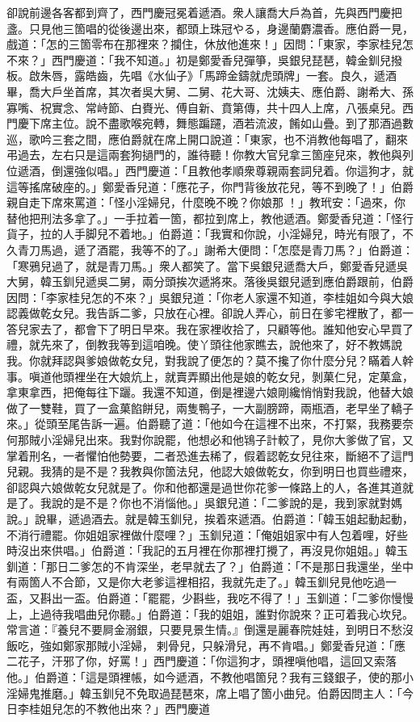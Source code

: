 卻說前邊各客都到齊了，西門慶冠冕着遞酒。衆人讓喬大戶為首，先與西門慶把盞。只見他三箇唱的從後邊出來，都頭上珠冠やる，身邊蘭麝濃香。應伯爵一見，戲道：「怎的三箇零布在那裡來？攔住，休放他進來！」因問：「東家，李家桂兒怎不來？」西門慶道：「我不知道。」初是鄭愛香兒彈箏，吳銀兒琵琶，韓金釧兒撥板。啟朱唇，露皓齒，先唱《水仙子》「馬蹄金鑄就虎頭牌」一套。{}良久，遞酒畢，喬大戶坐首席，其次者吳大舅、二舅、花大哥、沈姨夫、應伯爵、謝希大、孫寡嘴、祝實念、常峙節、白賚光、傅自新、賁第傳，共十四人上席，八張桌兒。西門慶下席主位。說不盡歌喉宛轉，舞態蹁躚，酒若流波，餚如山疊。到了那酒過數巡，歌吟三套之間，應伯爵就在席上開口說道：「東家，也不消教他每唱了，翻來弔過去，左右只是這兩套狗撾門的，誰待聽！你教大官兒拿三箇座兒來，教他與列位遞酒，倒還強似唱。」西門慶道：「且教他孝順衆尊親兩套詞兒着。你這狗才，就這等搖席破座的。」鄭愛香兒道：「應花子，你門背後放花兒，等不到晚了！」伯爵親自走下席來罵道：「怪小淫婦兒，什麼晚不晚？你娘那𣭈！」教玳安：「過來，你替他把刑法多拿了。」一手拉着一箇，都拉到席上，教他遞酒。鄭愛香兒道：「怪行貨子，拉的人手脚兒不着地。」伯爵道：「我實和你說，小淫婦兒，時光有限了，不久青刀馬過，遞了酒罷，我等不的了。」謝希大便問：「怎麼是青刀馬？」伯爵道：「寒鴉兒過了，就是青刀馬。」衆人都笑了。當下吳銀兒遞喬大戶，鄭愛香兒遞吳大舅，韓玉釧兒遞吳二舅，兩分頭挨次遞將來。落後吳銀兒遞到應伯爵跟前，伯爵因問：「李家桂兒怎的不來？」吳銀兒道：「你老人家還不知道，李桂姐如今與大娘認義做乾女兒。我告訴二爹，只放在心裡。卻說人弄心，前日在爹宅裡散了，都一答兒家去了，都會下了明日早來。我在家裡收拾了，只顧等他。誰知他安心早買了禮，就先來了，倒教我等到這咱晚。使丫頭往他家瞧去，說他來了，好不教媽說我。你就拜認與爹娘做乾女兒，對我說了便怎的？莫不攙了你什麼分兒？瞞着人幹事。嗔道他頭裡坐在大娘炕上，就賣弄顯出他是娘的乾女兒，剝菓仁兒，定菓盒，拿東拿西，把俺每往下躧。我還不知道，倒是裡邊六娘剛纔悄悄對我說，他替大娘做了一雙鞋，買了一盒菓餡餅兒，兩隻鴨子，一大副膀蹄，兩瓶酒，老早坐了轎子來。」從頭至尾告訴一遍。伯爵聽了道：「他如今在這裡不出來，不打緊，我務要奈何那賊小淫婦兒出來。我對你說罷，他想必和他鴇子計較了，見你大爹做了官，又掌着刑名，一者懼怕他勢要，二者恐進去稀了，假着認乾女兒往來，斷絕不了這門兒親。我猜的是不是？我教與你箇法兒，他認大娘做乾女，你到明日也買些禮來，卻認與六娘做乾女兒就是了。你和他都還是過世你花爹一條路上的人，各進其道就是了。我說的是不是？你也不消惱他。」吳銀兒道：「二爹說的是，我到家就對媽說。」說畢，遞過酒去。就是韓玉釧兒，挨着來遞酒。伯爵道：「韓玉姐起動起動，不消行禮罷。你姐姐家裡做什麼哩？」玉釧兒道：「俺姐姐家中有人包着哩，好些時沒出來供唱。」伯爵道：「我記的五月裡在你那裡打攪了，再沒見你姐姐。」韓玉釧道：「那日二爹怎的不肯深坐，老早就去了？」伯爵道：「不是那日我還坐，坐中有兩箇人不合節，又是你大老爹這裡相招，我就先走了。」韓玉釧兒見他吃過一盃，又斟出一盃。伯爵道：「罷罷，少斟些，我吃不得了！」玉釧道：「二爹你慢慢上，上過待我唱曲兒你聽。」伯爵道：「我的姐姐，誰對你說來？正可着我心坎兒。常言道：『養兒不要屙金溺銀，只要見景生情。』倒還是麗春院娃娃，到明日不愁沒飯吃，強如鄭家那賊小淫婦，𢱉剌骨兒，只躲滑兒，再不肯唱。」鄭愛香兒道：「應二花子，汗邪了你，好罵！」西門慶道：「你這狗才，頭裡嗔他唱，這回又索落他。」伯爵道：「這是頭裡帳，如今遞酒，不教他唱箇兒？我有三錢銀子，使的那小淫婦鬼推磨。」韓玉釧兒不免取過琵琶來，席上唱了箇小曲兒。伯爵因問主人：「今日李桂姐兒怎的不教他出來？」西門慶道
